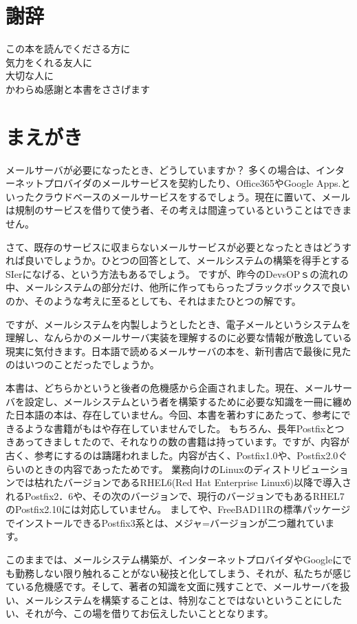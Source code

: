 \section*{謝辞}
\begin{center}
この本を読んでくださる方に \\
気力をくれる友人に \\
大切な人に \\
かわらぬ感謝と本書をささげます
\end{center}

\section*{まえがき}
メールサーバが必要になったとき、どうしていますか？
多くの場合は、インターネットプロバイダのメールサービスを契約したり、Office365やGoogle Apps.といったクラウドベースのメールサービスをするでしょう。現在に置いて、メールは規制のサービスを借りて使う者、その考えは間違っているということはできません。

さて、既存のサービスに収まらないメールサービスが必要となったときはどうすれば良いでしょうか。ひとつの回答として、メールシステムの構築を得手とするSIerになげる、という方法もあるでしょう。
ですが、昨今のDevsOPｓの流れの中、メールシステムの部分だけ、他所に作ってもらったブラックボックスで良いのか、そのような考えに至るとしても、それはまたひとつの解です。

ですが、メールシステムを内製しようとしたとき、電子メールというシステムを理解し、なんらかのメールサーバ実装を理解するのに必要な情報が散逸している現実に気付きます。日本語で読めるメールサーバの本を、新刊書店で最後に見たのはいつのことだったでしょうか。

本書は、どちらかというと後者の危機感から企画されました。現在、メールサーバを設定し、メールシステムという者を構築するために必要な知識を一冊に纏めた日本語の本は、存在していません。今回、本書を著わすにあたって、参考にできるような書籍がもはや存在していませんでした。
もちろん、長年Postfixとつきあってきましｔたので、それなりの数の書籍は持っています。ですが、内容が古く、参考にするのは躊躇われました。内容が古く、Postfix1.0や、Postfix2.0ぐらいのときの内容であったためです。
業務向けのLinuxのディストリビューションでは枯れたバージョンであるRHEL6(Red Hat Enterprise Linux6)以降で導入されるPostfix2．6や、その次のバージョンで、現行のバージョンでもあるRHEL7のPostfix2.10には対応していません。
ましてや、FreeBAD11Rの標準パッケージでインストールできるPostfix3系とは、メジャ=バージョンが二つ離れています。

このままでは、メールシステム構築が、インターネットプロバイダやGoogleにでも勤務しない限り触れることがない秘技と化してしまう、それが、私たちが感じている危機感です。そして、著者の知識を文面に残すことで、メールサーバを扱い、メールシステムを構築することは、特別なことではないということにしたい、それが今、この場を借りてお伝えしたいこととなります。


